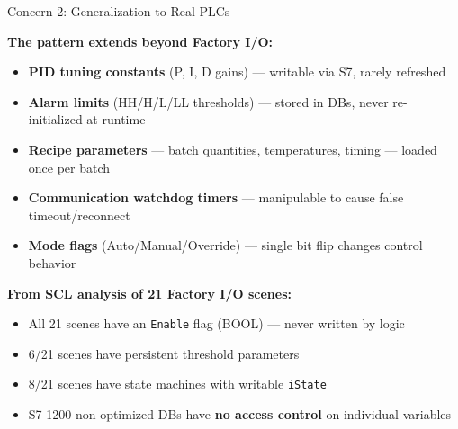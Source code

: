 \documentclass[aspectratio=169,10pt]{beamer}
\begin{document}
\begin{frame}{Concern 2: Generalization to Real PLCs}

\textbf{The pattern extends beyond Factory I/O:}

\begin{itemize}
    \item \textbf{PID tuning constants} (P, I, D gains) — writable via S7, rarely refreshed
    \item \textbf{Alarm limits} (HH/H/L/LL thresholds) — stored in DBs, never re-initialized at runtime
    \item \textbf{Recipe parameters} — batch quantities, temperatures, timing — loaded once per batch
    \item \textbf{Communication watchdog timers} — manipulable to cause false timeout/reconnect
    \item \textbf{Mode flags} (Auto/Manual/Override) — single bit flip changes control behavior
\end{itemize}

\vspace{0.5em}
\textbf{From SCL analysis of 21 Factory I/O scenes:}
\begin{itemize}
    \item All 21 scenes have an \texttt{Enable} flag (BOOL) — never written by logic
    \item 6/21 scenes have persistent threshold parameters
    \item 8/21 scenes have state machines with writable \texttt{iState}
    \item S7-1200 non-optimized DBs have \textbf{no access control} on individual variables
\end{itemize}
\end{frame}
\end{document}
